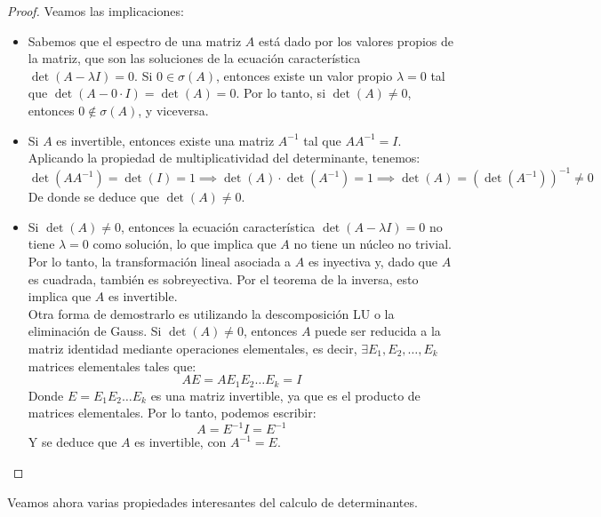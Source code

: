 \begin{proof}
    Veamos las implicaciones:
    \begin{itemize}
        \item[$2) \iff 3)$] Sabemos que el espectro de una matriz \( A \) está dado por los valores propios de la matriz, que son las soluciones de la ecuación característica \( \det(A - \lambda I) = 0 \). Si \( 0 \in \sigma(A) \), entonces existe un valor propio \( \lambda = 0 \) tal que \( \det(A - 0 \cdot I) = \det(A) = 0 \). Por lo tanto, si \( \det(A) \neq 0 \), entonces \( 0 \notin \sigma(A) \), y viceversa.
        \item[$1) \implies 2)$] Si \( A \) es invertible, entonces existe una matriz \( A^{-1} \) tal que \( AA^{-1} = I \). Aplicando la propiedad de multiplicatividad del determinante, tenemos:
        \[
            \det(AA^{-1}) = \det(I) = 1 \implies
            \det(A) \cdot \det(A^{-1}) = 1 \implies
            \det(A) = (\det(A^{-1}))^{-1} \neq 0
        \]
        De donde se deduce que \( \det(A) \neq 0 \).
        \item[$2) \implies 1)$] Si \( \det(A) \neq 0 \), entonces la ecuación característica \( \det(A - \lambda I) = 0 \) no tiene \( \lambda = 0 \) como solución, lo que implica que \( A \) no tiene un núcleo no trivial. Por lo tanto, la transformación lineal asociada a \( A \) es inyectiva y, dado que \( A \) es cuadrada, también es sobreyectiva. Por el teorema de la inversa, esto implica que \( A \) es invertible.\\
        Otra forma de demostrarlo es utilizando la descomposición LU o la eliminación de Gauss. Si \( \det(A) \neq 0 \), entonces \( A \) puede ser reducida a la matriz identidad mediante operaciones elementales, es decir, $\exists E_1, E_2, \dots, E_k$ matrices elementales tales que:
        \[
            A E =
            A E_1 E_2 \dots E_k = I
        \]
        Donde \( E = E_1 E_2 \dots E_k \) es una matriz invertible, ya que es el producto de matrices elementales. Por lo tanto, podemos escribir:
        \[
            A = E^{-1} I = E^{-1}
        \]
        Y se deduce que \( A \) es invertible, con \( A^{-1} = E \).
    \end{itemize}
\end{proof}

Veamos ahora varias propiedades interesantes del calculo de determinantes.

